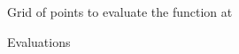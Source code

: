 \begin{frame}
    
    \begin{figure}
       \begin{center}
           \caption{Grid of points to evaluate the function at}
       \end{center}
    \end{figure}

\end{frame}

\begin{frame}
    
    \begin{figure}
       \begin{center}
           \caption{Evaluations}
       \end{center}
    \end{figure}

\end{frame}


